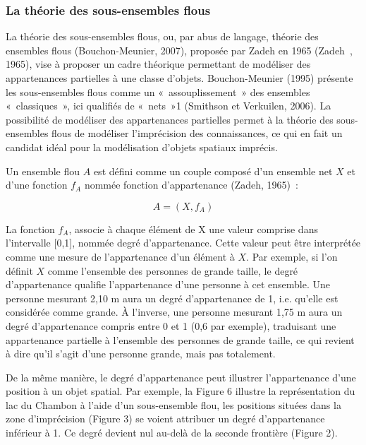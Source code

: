 \subsubsection{La théorie des sous-ensembles flous}

La théorie des sous-ensembles flous, ou, par abus de langage, théorie
des ensembles flous (Bouchon-Meunier, 2007), proposée par Zadeh en
1965 (Zadeh , 1965), vise à proposer un cadre théorique permettant de
modéliser des appartenances partielles à une classe
d’objets. Bouchon-Meunier (1995) présente les sous-ensembles flous
comme un « assouplissement » des ensembles « classiques », ici
qualifiés de « nets »1 (Smithson et Verkuilen, 2006). La possibilité
de modéliser des appartenances partielles permet à la théorie des
sous-ensembles flous de modéliser l’imprécision des connaissances, ce
qui en fait un candidat idéal pour la modélisation d’objets spatiaux
imprécis.

Un ensemble flou $A$ est défini comme un couple composé d’un ensemble
net $X$ et d’une fonction $f_A$ nommée fonction d’appartenance (Zadeh,
1965) :

\begin{equation}
  A = (X, f_A)  
\end{equation}

La fonction $f_A$, associe à chaque élément de X une valeur comprise
dans l’intervalle [0,1], nommée degré d’appartenance. Cette valeur
peut être interprétée comme une mesure de l’appartenance d’un élément
à $X$. Par exemple, si l’on définit $X$ comme l’ensemble des personnes
de grande taille, le degré d’appartenance qualifie l’appartenance
d’une personne à cet ensemble. Une personne mesurant 2,10 m aura un
degré d’appartenance de 1, i.e. qu’elle est considérée comme grande. À
l’inverse, une personne mesurant 1,75 m aura un degré d’appartenance
compris entre 0 et 1 (0,6 par exemple), traduisant une appartenance
partielle à l’ensemble des personnes de grande taille, ce qui revient
à dire qu’il s’agit d’une personne grande, mais pas totalement.

De la même manière, le degré d’appartenance peut illustrer
l’appartenance d’une position à un objet spatial. Par exemple, la
Figure 6 illustre la représentation du lac du Chambon à l’aide d’un
sous-ensemble flou, les positions situées dans la zone d’imprécision
(Figure 3) se voient attribuer un degré d’appartenance inférieur à
1. Ce degré devient nul au-delà de la seconde frontière (Figure 2).

